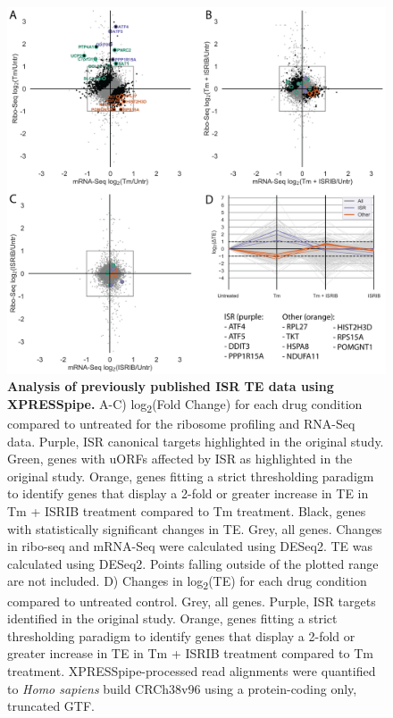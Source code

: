 \documentclass[10pt, oneside]{article}
\begin{document}
\begin{figure}
\centering
  \includegraphics[width=180mm]{figures/xpresspipe_figure3.png}
  \caption{\textbf{Analysis of previously published ISR TE data using XPRESSpipe.} A-C) log\textsubscript{2}(Fold Change) for each drug condition compared to untreated for the ribosome profiling and RNA-Seq data. Purple, ISR canonical targets highlighted in the original study. Green, genes with uORFs affected by ISR as highlighted in the original study. Orange, genes fitting a strict thresholding paradigm to identify genes that display a 2-fold or greater increase in TE in Tm + ISRIB treatment compared to Tm treatment. Black, genes with statistically significant changes in TE. Grey, all genes. Changes in ribo-seq and mRNA-Seq were calculated using DESeq2. TE was calculated using DESeq2. Points falling outside of the plotted range are not included. D) Changes in log\textsubscript{2}(TE) for each drug condition compared to untreated control. Grey, all genes. Purple, ISR targets identified in the original study. Orange, genes fitting a strict thresholding paradigm to identify genes that display a 2-fold or greater increase in TE in Tm + ISRIB treatment compared to Tm treatment. XPRESSpipe-processed read alignments were quantified to \textit{Homo sapiens} build CRCh38v96 using a protein-coding only, truncated GTF.}
  \label{fig:figure3}
\end{figure}
\end{document}
